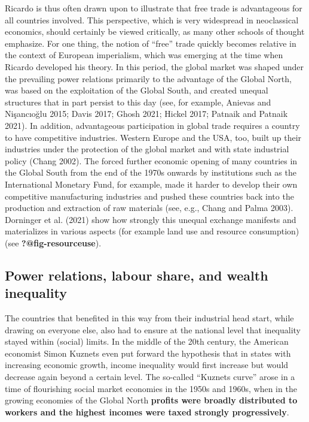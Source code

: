 \documentclass[
  british,
  a4paper,
  DIV=11,
  numbers=noendperiod,
  oneside,
  openany]{scrreprt}
\begin{document}
Ricardo is thus often drawn upon to illustrate that free trade is
advantageous for all countries involved. This perspective, which is very
widespread in neoclassical economics, should certainly be viewed
critically, as many other schools of thought emphasize. For one thing,
the notion of ``free'' trade quickly becomes relative in the context of
European imperialism, which was emerging at the time when Ricardo
developed his theory. In this period, the global market was shaped under
the prevailing power relations primarily to the advantage of the Global
North, was based on the exploitation of the Global South, and created
unequal structures that in part persist to this day (see, for example,
Anievas and Nişancıoğlu 2015; Davis 2017; Ghosh 2021; Hickel 2017;
Patnaik and Patnaik 2021). In addition, advantageous participation in
global trade requires a country to have competitive industries. Western
Europe and the USA, too, built up their industries under the protection
of the global market and with state industrial policy (Chang 2002). The
forced further economic opening of many countries in the Global South
from the end of the 1970s onwards by institutions such as the
International Monetary Fund, for example, made it harder to develop
their own competitive manufacturing industries and pushed these
countries back into the production and extraction of raw materials (see,
e.g., Chang and Palma 2003). Dorninger et al. (2021) show how strongly
this unequal exchange manifests and materializes in various aspects (for
example land use and resource consumption) (see
\textbf{?@fig-resourceuse}).

\subsection{Power relations, labour share, and wealth
inequality}\label{power-relations-labour-share-and-wealth-inequality}

The countries that benefited in this way from their industrial head
start, while drawing on everyone else, also had to ensure at the
national level that inequality stayed within (social) limits. In the
middle of the 20th century, the American economist Simon Kuznets even
put forward the hypothesis that in states with increasing economic
growth, income inequality would first increase but would decrease again
beyond a certain level. The so-called ``Kuznets curve'' arose in a time
of flourishing social market economies in the 1950s and 1960s, when in
the growing economies of the Global North \textbf{profits were broadly
distributed to workers and the highest incomes were taxed strongly
progressively}.
\end{document}
